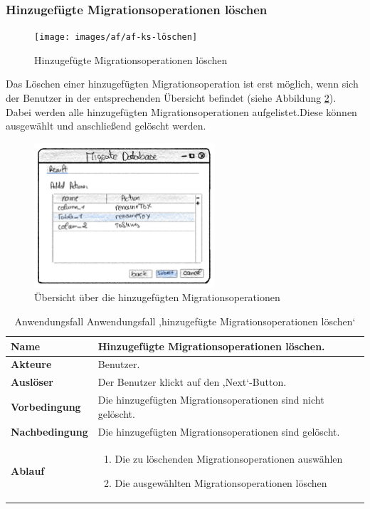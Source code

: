 \subsubsection*{Hinzugefügte Migrationsoperationen löschen}	
\begin{figure}[H]
	\centering
	\texttt{[image: images/af/af-ks-löschen]}
	\caption{Hinzugefügte Migrationsoperationen löschen}
	\label{img:af-ks-löschen}
\end{figure}
Das Löschen einer hinzugefügten Migrationsoperation ist erst möglich, wenn sich der Benutzer in der entsprechenden Übersicht befindet (siehe Abbildung \ref{img:result-view}). Dabei werden alle hinzugefügten Migrationsoperationen aufgelistet.Diese können ausgewählt und anschließend gelöscht werden.
\begin{figure}[H]
	\centering
	\includegraphics[width=0.6\textwidth]{images/result-view}
	\caption{Übersicht über die hinzugefügten Migrationsoperationen}
	\label{img:result-view}
\end{figure}
\begin{table}[H]
	\centering
	\caption{Anwendungsfall Anwendungsfall ,hinzugefügte Migrationsoperationen löschen‘}
	\begin{tabular}{ |p{4cm}|p{8cm}| }
		\hline
		\textbf{Name} &  Hinzugefügte Migrationsoperationen löschen. \\
		\hline
		\textbf{Akteure} &  Benutzer. \\
		\hline
		\textbf{Auslöser} & Der Benutzer klickt auf den ,Next‘-Button. \\
		\hline
		\textbf{Vorbedingung} & Die hinzugefügten Migrationsoperationen sind nicht gelöscht.  \\
		\hline
		\textbf{Nachbedingung} &  Die hinzugefügten Migrationsoperationen sind gelöscht. \\
		\hline
		\textbf{Ablauf} &  
		\begin{enumerate}
			\item Die zu löschenden Migrationsoperationen auswählen
			\item Die ausgewählten Migrationsoperationen löschen
		\end{enumerate}  \\
		\hline
		
	\end{tabular}
	\label{table:migration-ks-löschen}
\end{table}



